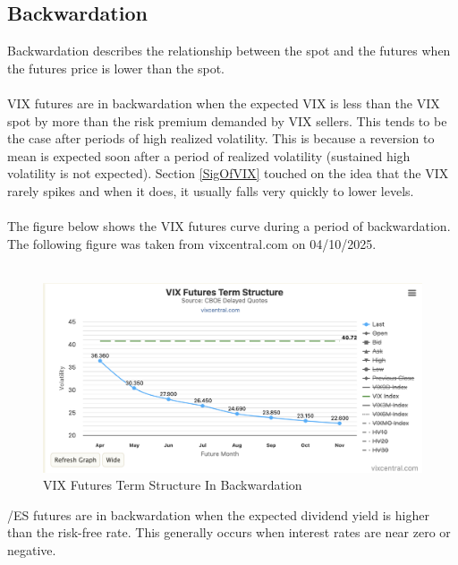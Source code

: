 \documentclass[11pt, oneside]{book}
\begin{document}
\subsection{Backwardation} \label{Futures-ConBackPar-Back}
Backwardation describes the relationship between the spot and the futures when the futures price is lower than the spot.\\
\\
VIX futures are in backwardation when the expected VIX is less than the VIX spot by more than the risk premium demanded by VIX sellers. This tends to be the case after periods of high realized volatility. This is because a reversion to mean is expected soon after a period of realized volatility (sustained high volatility is not expected). Section \ref{SigOfVIX} touched on the idea that the VIX rarely spikes and when it does, it usually falls very quickly to lower levels.\\
\\
The figure below shows the VIX futures curve during a period of backwardation. The following figure was taken from vixcentral.com on 04/10/2025.
\\
\\
\begin{figure}[H]
\centering
\includegraphics[width=\textwidth]{VIXFuturesBackwardation.png}
\caption{VIX Futures Term Structure In Backwardation} \label{Fig-VIXFuturesBackwardation}
\end{figure}
\noindent
/ES futures are in backwardation when the expected dividend yield is higher than the risk-free rate. This generally occurs when interest rates are near zero or negative.
\end{document}
